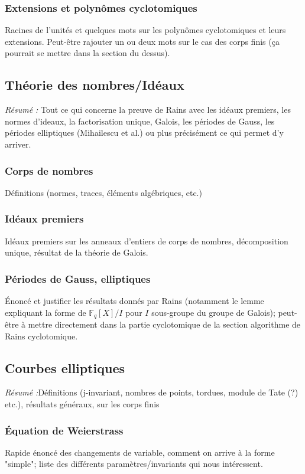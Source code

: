 \documentclass[a4paper]{article} %
\numberwithin{equation}{section}
\newcommand\GF[1]{\mathbb{F}_{#1}}
\begin{document}
\subsubsection{Extensions et polynômes cyclotomiques}
Racines de l'unités et quelques mots sur les polynômes cyclotomiques et leurs 
extensions. Peut-être rajouter un ou deux mots sur le cas des corps finis (ça 
pourrait se mettre dans la section du dessus).

\subsection{Théorie des nombres/Idéaux}
\textit{Résumé :} Tout ce qui concerne la preuve de Rains avec les idéaux 
premiers, les normes d'ideaux, la factorisation unique, Galois, les périodes de 
Gauss, les périodes elliptiques (Mihailescu et al.) ou plus précisément ce qui 
permet d'y arriver.
\subsubsection{Corps de nombres}
Définitions (normes, traces, éléments algébriques, etc.)
\subsubsection{Idéaux premiers}
 Idéaux premiers sur les anneaux d'entiers de corps de nombres,
 décomposition unique, résultat de la théorie de Galois.
\subsubsection{Périodes de Gauss, elliptiques}
Énoncé et justifier les résultats donnés par Rains (notamment le lemme
expliquant la forme de $\GF{q}[X]/I$ pour $I$ sous-groupe du groupe de Galois);
peut-être à mettre directement dans la partie cyclotomique de la section
algorithme de Rains cyclotomique.

\subsection{Courbes elliptiques}
\textit{Résumé :}Définitions (j-invariant, nombres de points, tordues, module de
Tate (?) etc.), résultats généraux, sur les corps finis
\subsubsection{Équation de Weierstrass}
Rapide énoncé des changements de variable, comment on arrive à la forme
"simple"; liste des différents paramètres/invariants qui nous intéressent.
\end{document}
